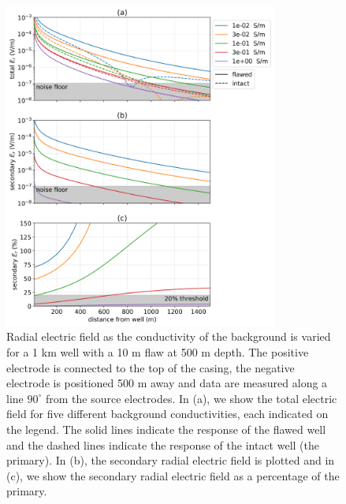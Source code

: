 \begin{figure}
    \begin{center}
    \includegraphics[width=0.8\textwidth]{figures/integrity_conductivity.png}
    \end{center}
\caption{
    Radial electric field as the conductivity of the background is varied for a 1 km well with a 10 m flaw at 500 m depth.
    The positive electrode is connected to the top of the casing, the negative electrode
    is positioned 500 m away and data are measured along a line $90^\circ$ from the
    source electrodes. In (a), we show the total electric field for five different background conductivities,
    each indicated on the legend. The solid lines indicate the response of the flawed well and the dashed lines indicate the response of the intact well (the primary).
    In (b), the secondary radial electric field is plotted and in (c), we show the
    secondary radial electric field as a percentage of the primary.
}
\label{fig:integrity_conductivity}
\end{figure}
